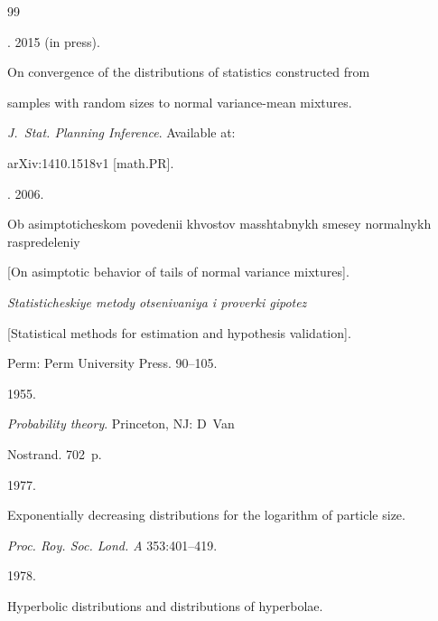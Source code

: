 {{\begin{thebibliography}{99}


. 2015 (in press).


On convergence of the distributions of statistics constructed from


samples with random sizes to normal variance-mean mixtures.


\textit{J.~Stat. Planning Inference}. Available at:


arXiv:1410.1518v1 [math.PR].







. 2006.


Ob asimptoticheskom povedenii khvostov masshtabnykh smesey normalnykh raspredeleniy


[On asimptotic behavior of tails of normal variance mixtures].


\textit{Statisticheskiye metody otsenivaniya i proverki gipotez}


[Statistical methods for estimation and hypothesis validation].


Perm: Perm University Press. 90--105.













  1955.


\textit{Probability theory}. Princeton, NJ: D~Van


Nostrand. 702~p.







 1977.


Exponentially decreasing distributions for the logarithm of particle size.


\textit{Proc. Roy. Soc. Lond. A} 353:401--419.







 1978.


Hyperbolic distributions and distributions of hyperbolae.



\end{thebibliography}}}
